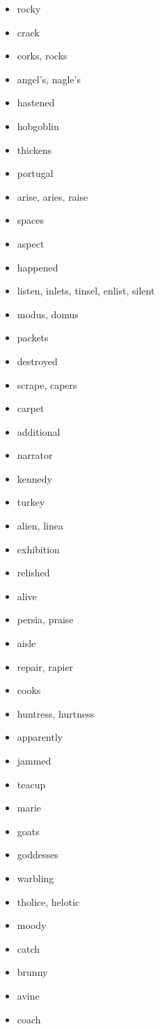 \documentclass{article}
\begin{document}
\begin{itemize}
    \item rocky
    \item crack
    \item corks, rocks
    \item angel's, nagle's
    \item hastened
    \item hobgoblin
    \item thickens
    \item portugal
    \item arise, aries, raise
    \item spaces
    \item aspect
    \item happened
    \item listen, inlets, tinsel, enlist, silent
    \item modus, domus
    \item packets
    \item destroyed
    \item scrape, capers
    \item carpet
    \item additional
    \item narrator
    \item kennedy
    \item turkey
    \item alien, linea
    \item exhibition
    \item relished
    \item alive
    \item persia, praise
    \item aisle
    \item repair, rapier
    \item cooks
    \item huntress, hurtness
    \item apparently
    \item jammed
    \item teacup
    \item marie
    \item goats
    \item goddesses
    \item warbling
    \item tholice, helotic
    \item moody
    \item catch
    \item brunny
    \item avine
    \item coach

\end{itemize}
\end{document}
